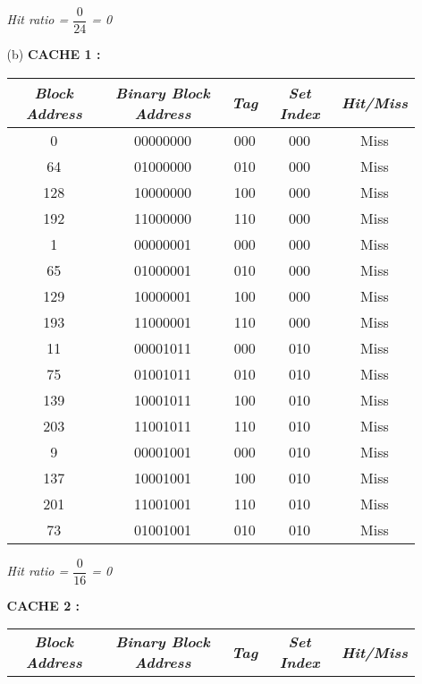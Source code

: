 \documentclass[letterpaper]{article}
\begin{document}
\begin{large}
\begin{flushleft}
\begin{enumerate}
\begin{enumerate}
\begin{table}[h]
\end{table}
\begin{center}
\textit{Hit ratio = $\dfrac{0}{24}$ = 0}\\[0.2in]
\end{center}
\clearpage
\item[(b)]
\textbf{CACHE 1 :}\\
\begin{table}[h]
\centering
\begin{tabular}{|c|c|c|c|c|}
\hline
\textit{\textbf{Block Address}} & \textit{\textbf{Binary Block Address }}&\textit{\textbf{ Tag }}& \textit{\textbf{Set Index }}& \textit{\textbf{Hit/Miss}}\\
\hline
0 & 00000000 & 000 & 000 & Miss\\
\hline
64 & 01000000 & 010 & 000 & Miss\\
\hline
128 & 10000000 & 100 & 000 & Miss\\
\hline
192 & 11000000 & 110 & 000 & Miss\\
\hline
1 & 00000001 & 000 & 000 & Miss\\
\hline
65 & 01000001 & 010 & 000 & Miss\\
\hline
129 & 10000001 & 100 & 000 & Miss\\
\hline
193 & 11000001 & 110 & 000 & Miss\\
\hline
11 & 00001011 & 000 & 010 & Miss\\
\hline
75 & 01001011 & 010 & 010 & Miss\\
\hline 
139 & 10001011 & 100 & 010 & Miss\\
\hline
203 & 11001011 & 110 & 010 & Miss\\
\hline
9 & 00001001 & 000 & 010 & Miss\\
\hline
137 & 10001001 & 100 & 010 & Miss\\
\hline
201 & 11001001 & 110 & 010 & Miss\\
\hline
73 & 01001001 & 010 & 010 & Miss\\
\hline
\end{tabular}
\end{table}
\begin{center}
\textit{Hit ratio = $\dfrac{0}{16}$ = 0}\\[0.2in]
\end{center}
\textbf{CACHE 2 :}\\
\begin{table}[h]
\centering
\begin{tabular}{|c|c|c|c|c|}
\hline
\textit{\textbf{Block Address}} & \textit{\textbf{Binary Block Address }}&\textit{\textbf{ Tag }}& \textit{\textbf{Set Index }}& \textit{\textbf{Hit/Miss}}\\

\end{tabular}
\end{table}
\end{enumerate}
\end{enumerate}
\end{flushleft}
\end{large}
\end{document}
